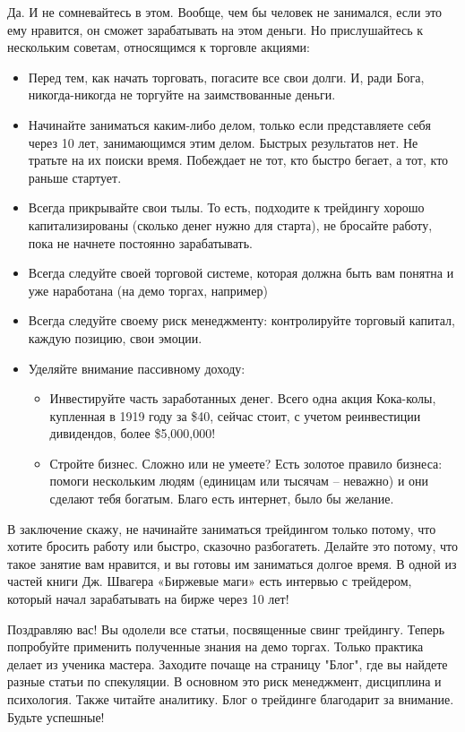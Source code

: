 \documentclass[a5paper]{article}
\begin{document}
Да. И не сомневайтесь в этом. Вообще, чем бы человек не занимался, если это ему нравится, он сможет зарабатывать на этом деньги. Но прислушайтесь к нескольким советам, относящимся к торговле акциями:
\begin{itemize}
\item     Перед тем, как начать торговать, погасите все свои долги. И, ради Бога, никогда-никогда не торгуйте на заимствованные деньги.
\item     Начинайте заниматься каким-либо делом, только если представляете себя через 10 лет, занимающимся этим делом. Быстрых результатов нет. Не тратьте на их поиски время. Побеждает не тот, кто быстро бегает, а тот, кто раньше стартует.
\item     Всегда прикрывайте свои тылы. То есть, подходите к трейдингу хорошо капитализированы (сколько денег нужно для старта), не бросайте работу, пока не начнете постоянно зарабатывать.
\item     Всегда следуйте своей торговой системе, которая должна быть вам понятна и уже наработана (на демо торгах, например)
\item     Всегда следуйте своему риск менеджменту: контролируйте торговый капитал, каждую позицию, свои эмоции.
\item     Уделяйте внимание пассивному доходу:
  \begin{itemize}
  \item         Инвестируйте часть заработанных денег. Всего одна акция Кока-колы, купленная в 1919 году за \$40, сейчас стоит, с учетом реинвестиции дивидендов, более \$5,000,000!
  \item         Стройте бизнес. Сложно или не умеете? Есть золотое правило бизнеса: помоги нескольким людям (единицам или тысячам – неважно) и они сделают тебя богатым. Благо есть интернет, было бы желание.
  \end{itemize}
\end{itemize}

В заключение скажу, не начинайте заниматься трейдингом только потому, что хотите бросить работу или быстро, сказочно разбогатеть. Делайте это потому, что такое занятие вам нравится, и вы готовы им заниматься долгое время. В одной из частей книги Дж. Швагера «Биржевые маги» есть интервью с трейдером, который начал зарабатывать на бирже через 10 лет!

Поздравляю вас! Вы одолели все статьи, посвященные свинг трейдингу. Теперь попробуйте применить полученные знания на демо торгах. Только практика делает из ученика мастера. Заходите почаще на страницу "Блог", где вы найдете разные статьи по спекуляции. В основном это риск менеджмент, дисциплина и психология. Также читайте аналитику. Блог о трейдинге благодарит за внимание. Будьте успешные!
\end{document}
